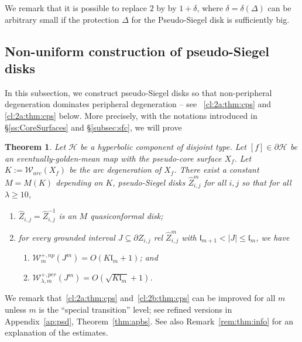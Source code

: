 \documentclass[11pt, reqno]{amsart}
\numberwithin{equation}{section}
\theoremstyle{plain}
\newtheorem{theorem}{Theorem}[section]
\theoremstyle{theorem}
\theoremstyle{plain}
\theoremstyle{definition}
\numberwithin{figure}{section}
\newcommand{\length}{{\mathfrak l}}
\begin{document}
We remark that it is possible to replace $2$ by by $1+\delta$, where $\delta=\delta(\Delta)$ can be arbitrary small if the protection $\Delta$ for the Pseudo-Siegel disk is sufficiently big.


\subsection{Non-uniform construction of pseudo-Siegel disks}\label{sec:cps}


In this subsection, we construct pseudo-Siegel disks so that non-peripheral degeneration dominates peripheral degeneration -- see~ \eqref{cl:2a:thm:cps} and \eqref{cl:2a:thm:cps} below.
More precisely, with the notations introduced in \S \ref{ss:CoreSurfaces} and \S \ref{subsec:sfc}, we will prove
\begin{theorem}\label{thm:cps}
Let $\mathcal{H}$ be a hyperbolic component of disjoint type.
Let $[f]\in \partial \mathcal{H}$ be an eventually-golden-mean map with the pseudo-core surface $X_f$.
Let $K:=\mathcal{W}_{arc}(X_f)$ be the arc degeneration of $X_f$.
There exist a constant $M = M(K)$ depending on $K$, pseudo-Siegel disks $\widehat{Z}_{i,j}^m$ for all $i,j$ so that for all $\lambda \geq 10$,
\begin{enumerate}
    \item $\widehat{Z}_{i,j} = \widehat{Z}_{i,j}^{-1}$ is an $M$ quasiconformal disk;
    \item \label{cl:2:thm:cps} for every grounded interval $J \subseteq \partial Z_{i,j}$ rel $\widehat{Z}_{i,j}^m$ with $\length_{m+1} < |J| \leq \length_m$, we have
    \begin{enumerate}
        \item\label{cl:2a:thm:cps} $\mathcal{W}^{+, np}_{m}(J^m) = O(K\length_m + 1)$; and 
        \item \label{cl:2b:thm:cps}$\mathcal{W}^{+, per}_{\lambda, m}(J^{m}) = O(\sqrt{K\length_{m}} + 1)$.
    \end{enumerate}
\end{enumerate}
\end{theorem}

We remark that~\eqref{cl:2a:thm:cps} and~\eqref{cl:2b:thm:cps} can be improved for all $m$ unless $m$ is the ``special transition'' level; see refined versions in Appendix~\ref{ap:psd}, Theorem~\ref{thm:apbs}. See also Remark~\ref{rem:thm:info} for an explanation of the estimates.  
\end{document}
